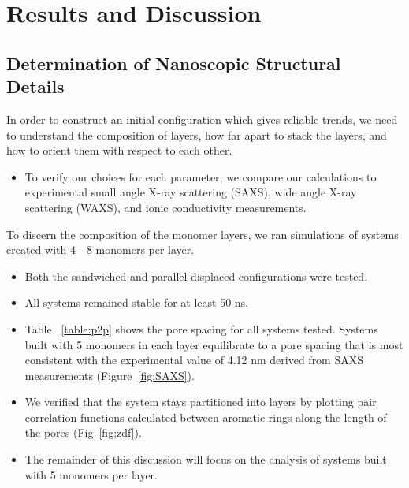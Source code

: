 \documentclass{article}
\begin{document}
  \section*{Results and Discussion}
  
  \subsection*{Determination of Nanoscopic Structural Details}
  
  In order to construct an initial configuration which gives reliable 
  trends, we need to understand the composition of layers, how far apart
  to stack the layers, and how to orient them with respect to each other.
  \begin{itemize}
  	\item To verify our choices for each parameter, we compare our calculations
	to experimental small angle X-ray scattering (SAXS), wide angle X-ray
	scattering (WAXS), and ionic conductivity measurements.
  \end{itemize}
  
  To discern the composition of the monomer layers, we ran simulations of 
  systems created with 4 - 8 monomers per layer.
  \begin{itemize}
  	\item Both the sandwiched and parallel displaced configurations were tested.
	\item All systems remained stable for at least 50 ns.
	\item Table ~\ref{table:p2p} shows the pore spacing for all systems tested. 
	Systems built with 5 monomers in each layer equilibrate to a pore spacing
	that is most consistent with the experimental value of 4.12 nm derived from
	SAXS measurements (Figure~\ref{fig:SAXS}).
	\item We verified that the system stays partitioned into layers by plotting 
	pair correlation functions calculated between aromatic rings along the length
	of the pores (Fig~\ref{fig:zdf}).
	\item The remainder of this discussion will focus on the analysis of systems
	built with 5 monomers per layer. 
  \end{itemize}
  
\end{document}
